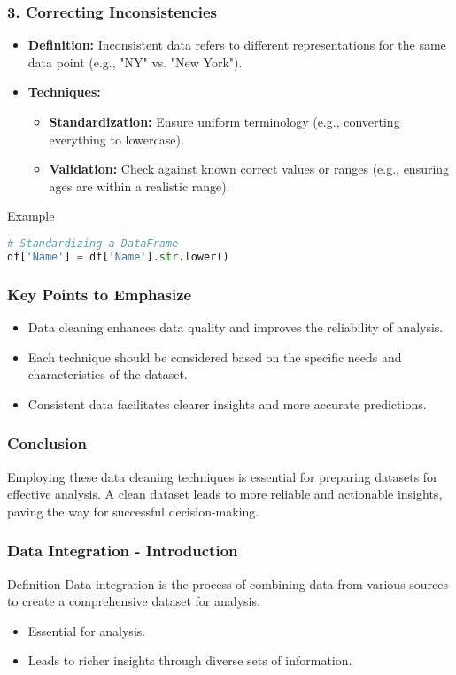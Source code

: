 \documentclass[aspectratio=169]{beamer}
\begin{document}
\begin{frame}[fragile]
    \frametitle{3. Correcting Inconsistencies}
    \begin{itemize}
        \item \textbf{Definition:} Inconsistent data refers to different representations for the same data point (e.g., "NY" vs. "New York").
        \item \textbf{Techniques:}
        \begin{itemize}
            \item \textbf{Standardization:} Ensure uniform terminology (e.g., converting everything to lowercase).
            \item \textbf{Validation:} Check against known correct values or ranges (e.g., ensuring ages are within a realistic range).
        \end{itemize}
    \end{itemize}
    \begin{block}{Example}
    \begin{lstlisting}[language=Python]
# Standardizing a DataFrame
df['Name'] = df['Name'].str.lower()
    \end{lstlisting}
    \end{block}
\end{frame}

\begin{frame}
    \frametitle{Key Points to Emphasize}
    \begin{itemize}
        \item Data cleaning enhances data quality and improves the reliability of analysis.
        \item Each technique should be considered based on the specific needs and characteristics of the dataset.
        \item Consistent data facilitates clearer insights and more accurate predictions.
    \end{itemize}
\end{frame}

\begin{frame}
    \frametitle{Conclusion}
    Employing these data cleaning techniques is essential for preparing datasets for effective analysis. A clean dataset leads to more reliable and actionable insights, paving the way for successful decision-making.
\end{frame}

\begin{frame}[fragile]
    \frametitle{Data Integration - Introduction}
    \begin{block}{Definition}
        Data integration is the process of combining data from various sources to create a comprehensive dataset for analysis.
    \end{block}
    \begin{itemize}
        \item Essential for analysis.
        \item Leads to richer insights through diverse sets of information.
    \end{itemize}
\end{frame}
\end{document}
